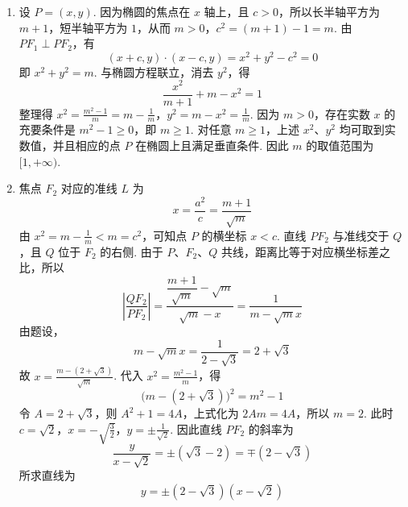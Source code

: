 \begin{solution}
\begin{enumerate}
\item 设 \(P=(x,y)\). 因为椭圆的焦点在 \(x\) 轴上，且 \(c>0\)，所以长半轴平方为 \(m+1\)，短半轴平方为 \(1\)，从而
\(m>0\)，\(c^2=(m+1)-1=m\).
由 \(PF_1\perp PF_2\)，有
\[
(x+c,y)\cdot(x-c,y)=x^2+y^2-c^2=0
\]
即 \(x^2+y^2=m\). 与椭圆方程联立，消去 \(y^2\)，得
\[
\frac{x^2}{m+1}+m-x^2=1
\]
整理得
\(x^2=\frac{m^2-1}{m}=m-\frac1m\)，\(y^2=m-x^2=\frac1m\).
因为 \(m>0\)，存在实数 \(x\) 的充要条件是 \(m^2-1\geqslant0\)，即 \(m\geqslant1\). 对任意 \(m\geqslant1\)，上述 \(x^2\)、\(y^2\) 均可取到实数值，并且相应的点 \(P\) 在椭圆上且满足垂直条件. 因此 \(m\) 的取值范围为 \([1,+\infty)\).

\item 焦点 \(F_2\) 对应的准线 \(L\) 为
\[
x=\frac{a^2}{c}=\frac{m+1}{\sqrt m}
\]
由 \(x^2=m-\frac1m<m=c^2\)，可知点 \(P\) 的横坐标 \(x<c\). 直线 \(PF_2\) 与准线交于 \(Q\)，且 \(Q\) 位于 \(F_2\) 的右侧. 由于 \(P\)、\(F_2\)、\(Q\) 共线，距离比等于对应横坐标差之比，所以
\[
\left|\frac{QF_2}{PF_2}\right|
=\frac{\dfrac{m+1}{\sqrt m}-\sqrt m}{\sqrt m-x}
=\frac{1}{m-\sqrt{m}x}
\]
由题设，
\[
m-\sqrt{m}x=\frac1{2-\sqrt3}=2+\sqrt3
\]
故 \(x=\frac{m-(2+\sqrt3)}{\sqrt m}\).
代入 \(x^2=\frac{m^2-1}{m}\)，得
\[
\bigl(m-(2+\sqrt3)\bigr)^2=m^2-1
\]
令 \(A=2+\sqrt3\)，则 \(A^2+1=4A\)，上式化为 \(2Am=4A\)，所以 \(m=2\). 此时
\(c=\sqrt2\)，\(x=-\sqrt{\frac32}\)，\(y=\pm\frac1{\sqrt2}\).
因此直线 \(PF_2\) 的斜率为
\[
\frac{y}{x-\sqrt2}=\pm(\sqrt3-2)=\mp(2-\sqrt3)
\]
所求直线为
\[
y=\pm(2-\sqrt3)(x-\sqrt2)
\]
\end{enumerate}
\end{solution}
